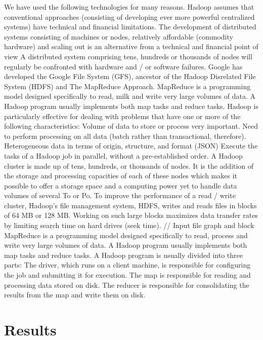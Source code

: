 \documentclass{acmtog} %
\begin{document}
We have used the following technologies for many reasons. Hadoop assumes that conventional approaches (consisting of developing ever more powerful centralized systems) have technical and financial limitations. The development of distributed systems consisting of machines or nodes, relatively affordable (commodity hardware) and scaling out is an alternative from a technical and financial point of view A distributed system comprising tens, hundreds or thousands of nodes will regularly be confronted with hardware and / or software failures. Google has developed the Google File System (GFS), ancestor of the Hadoop Disrelated File System (HDFS) and The MapReduce Approach. MapReduce is a programming model designed specifically to read, milk and write very large volumes of data. A Hadoop program usually implements both map tasks and reduce tasks.
Hadoop is particularly effective for dealing with problems that have one or more of the following characteristics: Volume of data to store or process very important. Need to perform processing on all data (batch rather than transactional, therefore). Heterogeneous data in terms of origin, structure, and format (JSON) Execute the tasks of a Hadoop job in parallel, without a pre-established order. A Hadoop cluster is made up of tens, hundreds, or thousands of nodes. It is the addition of the storage and processing capacities of each of these nodes which makes it possible to offer a storage space and a computing power yet to handle data volumes of several To or Po. To improve the performance of a read / write cluster, Hadoop’s file management system, HDFS, writes and reads files in blocks of 64 MB or 128 MB. Working on such large blocks maximizes data transfer rates by limiting search time on hard drives (seek time). // Input file graph and block MapReduce is a programming model designed specifically to read, process and write very large volumes of data. A Hadoop program usually implements both map tasks and reduce tasks. A Hadoop program is usually divided into three parts: The driver, which runs on a client machine, is responsible for configuring the job and submitting it for execution. The map is responsible for reading and processing data stored on disk. The reducer is responsible for consolidating the results from the map and write them on disk.

\section{Results}
\label{sub:results}
\end{document}
